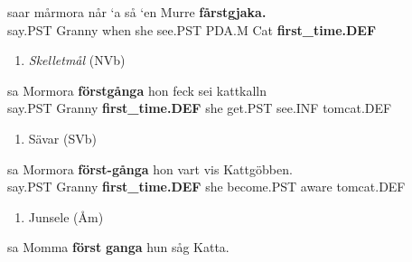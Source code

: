 \ea\label{}
\gll saar  mårmora  når  ‘a  så  ‘en  Murre  \textbf{fårstgjaka.}\\


say.PST  Granny  when  she  see.PST  PDA.M  Cat  \textbf{first\_time.DEF}\\ %


\begin{enumerate} %
\item 
\textit{Skelletmål} (NVb)
\end{enumerate} %
\ea\label{}
\gll sa  Mormora  \textbf{förstgånga} hon  feck  sei  kattkalln\\


say.PST  Granny  \textbf{first\_time.DEF} she  get.PST  see.INF  tomcat.DEF\\ %


\begin{enumerate} %
\item 
Sävar (SVb)

\end{enumerate} %
\ea\label{}
\gll sa  Mormora  \textbf{först-gånga} hon  vart  vis  Kattgöbben.\\


say.PST  Granny  \textbf{first\_time.DEF} she  become.PST  aware  tomcat.DEF\\ %


\begin{enumerate} %
\item 
Junsele (Åm)

\end{enumerate} %
\ea\label{}
\gll sa  Momma  \textbf{först}\textbf{  ganga} hun  såg  Katta.\\


